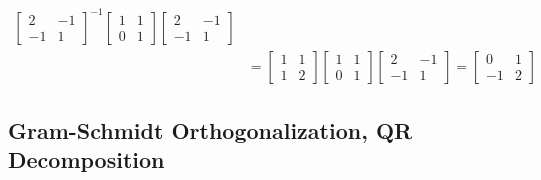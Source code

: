 \begin{solution}
\begin{align*}
\begin{bmatrix}
2 & -1 \\
-1 & 1
\end{bmatrix}^{-1}
\begin{bmatrix}
1 & 1 \\
0 & 1
\end{bmatrix}
\begin{bmatrix}
2 & -1 \\
-1 & 1
\end{bmatrix} \\
&= 
\begin{bmatrix}
1 & 1 \\
1 & 2
\end{bmatrix}
\begin{bmatrix}
1 & 1 \\
0 & 1
\end{bmatrix}
\begin{bmatrix}
2 & -1 \\
-1 & 1
\end{bmatrix}
=
\begin{bmatrix}
0 & 1\\
-1 & 2
\end{bmatrix}
\end{align*}
\end{solution}

\subsection{Gram-Schmidt Orthogonalization, QR Decomposition}

